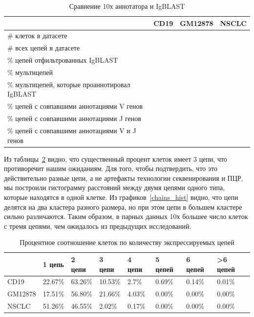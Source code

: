 \documentclass{spbau-diploma}
\begin{document}
\begin{table}[h!]
\centering
\begin{tabular}{|l|l|l|l|}
\hline
                    & \textbf{CD19} & \textbf{GM12878} & \textbf{NSCLC} \\ \hline
\# клеток в датасете                           &      &         &       \\ \hline
\# всех цепей в датасете                       &      &         &       \\ \hline
\% цепей отфильтрованных IgBLAST               &      &         &       \\ \hline
\% мультицепей                                 &      &         &       \\ \hline
\% мультицепей, которые проаннотировал IgBLAST &      &         &       \\ \hline
\% цепей с совпавшими аннотациями V генов      &      &         &       \\ \hline
\% цепей с совпавшими аннотациями J генов      &      &         &       \\ \hline
\% цепей с совпавшими аннотациями V и J генов  &      &         &       \\ \hline
\end{tabular}
\caption{Сравнение 10х аннотатора и IgBLAST}
\label{10x_vs_IgBLAST}
\end{table}

Из таблицы~\ref{stats_nchains} видно, что существенный процент клеток имеет $3$ цепи, что противоречит нашим ожиданиям. Для того, чтобы подтвердить, что это действительно разные цепи, а не артефакты технологии секвенирования и ПЦР, мы построили гистограмму расстояний между двумя цепями одного типа, которые находятся в одной клетке. Из графиков~\ref{chains_hist} видно, что цепи делятся на два кластера разного размера, но при этом цепи в большем кластере сильно различаются. Таким образом, в парных данных 10х большее число клеток с тремя цепями, чем ожидалось из предыдущих исследований. 

\begin{table}[h!]
\centering
\begin{tabular}{|l|l|l|l|l|l|l|l|}
\hline
        & \textbf{1 цепь} & \textbf{2 цепи} & \textbf{3 цепи} & \textbf{4 цепи} & \textbf{5 цепей} & \textbf{6 цепей} & \textbf{\textgreater{}6 цепей} \\ \hline
CD19    & 22.67\%         & 63.26\%         & 10.53\%         & 2.7\%           & 0.69\%           & 0.14\%           & 0.01\%                         \\ \hline
GM12878 & 17.51\%         & 56.80\%         & 21.66\%         & 4.03\%          & 0.00\%           & 0.00\%           & 0.00\%                         \\ \hline
NSCLC   & 51.26\%         & 46.55\%         & 2.02\%          & 0.17\%          & 0.00\%           & 0.00\%           & 0.00\%                         \\ \hline
\end{tabular}
\caption{Процентное соотношение клеток по количеству экспрессируемых цепей}
\label{stats_nchains}
\end{table}
\end{document}
